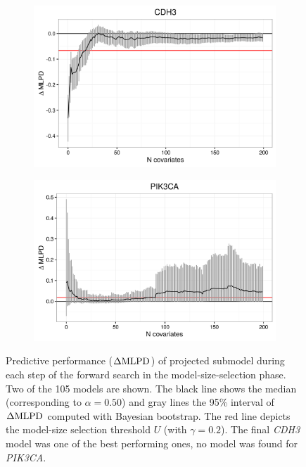 \begin{figure}[!h]
  \centering
  \begin{subfigure}{.45\textwidth}
    \includegraphics[width=1\linewidth]{figures/CDH3_CV_path.png}
  \end{subfigure}
  \begin{subfigure}{.45\textwidth}
    \includegraphics[width=1\linewidth]{figures/PIK3CA_CV_path.png}
  \end{subfigure}

  \caption{Predictive performance ($\Delta\textup{MLPD}$) of projected submodel during
  each step of the forward search in the model-size-selection phase. Two of the 105 models are shown.
  The black line shows the median (corresponding to $\alpha = 0.50$) and
  gray lines the 95\% interval of $\Delta\textup{MLPD}$ computed with Bayesian bootstrap.
  The red line depicts the model-size selection threshold $U$ (with $\gamma=0.2$).
  The final \emph{CDH3} model was one of the best performing ones,
  no model was found for \emph{PIK3CA}.}
  \label{fig:forward-search}
\end{figure}

